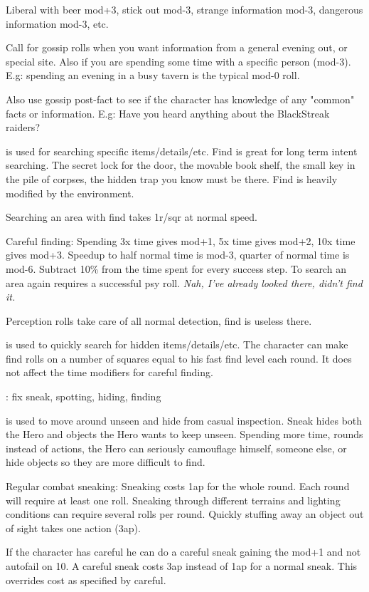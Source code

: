 Liberal with beer mod+3, stick out mod-3, strange information mod-3, dangerous information mod-3, etc.

Call for gossip rolls when you want information from a general evening out, or special site. Also if you are spending some time with a specific person (mod-3). E.g: spending an evening in a busy tavern is the typical mod-0 roll.

Also use gossip post-fact to see if the character has knowledge of any "common" facts or information. E.g: Have you heard anything about the BlackStreak raiders?


 is used for searching specific items/details/etc. Find is great for long term intent searching. The secret lock for the door, the movable book shelf, the small key in the pile of corpses, the hidden trap you know must be there. Find is heavily modified by the environment.

Searching an area with find takes 1r/sqr at normal speed.

Careful finding: Spending 3x time gives mod+1, 5x time gives mod+2, 10x time gives mod+3. Speedup to half normal time is mod-3, quarter of normal time is mod-6. Subtract 10\% from the time spent for every success step. To search an area again requires a successful psy roll. \emph{Nah, I've already looked there, didn't find it.}

Perception rolls take care of all normal detection, find is useless there.


 is used to quickly search for hidden items/details/etc. The character can make find rolls on a number of squares equal to his fast find level each round. It does not affect the time modifiers for careful finding.


\TODO: fix sneak, spotting, hiding, finding

 is used to move around unseen and hide from casual inspection. Sneak hides both the Hero and objects the Hero wants to keep unseen. Spending more time, rounds instead of actions, the Hero can seriously camouflage himself, someone else, or hide objects so they are more difficult to find.

Regular combat sneaking: Sneaking costs 1ap for the whole round. Each round will require at least one roll. Sneaking through different terrains and lighting conditions can require several rolls per round. Quickly stuffing away an object out of sight takes one action (3ap).

If the character has careful he can do a careful sneak gaining the mod+1 and not autofail on 10. A careful sneak costs 3ap instead of 1ap for a normal sneak. This overrides cost as specified by careful.

